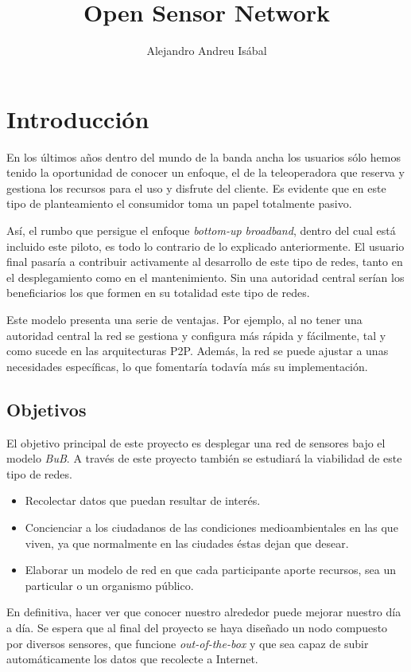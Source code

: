 \documentclass[a4paper]{article}
\title{Open Sensor Network}
\author{Alejandro Andreu Isábal}
\begin{document}
\maketitle

\section{Introducción}

En los últimos años dentro del mundo de la banda ancha los usuarios sólo hemos tenido la oportunidad de conocer un enfoque, el de la teleoperadora que reserva y gestiona los recursos para el uso y disfrute del cliente. Es evidente que en este tipo de planteamiento el consumidor toma un papel totalmente pasivo.

Así, el rumbo que persigue el enfoque \emph{bottom-up broadband}, dentro del cual está incluido este piloto, es todo lo contrario de lo explicado anteriormente. El usuario final pasaría a contribuir activamente al desarrollo de este tipo de redes, tanto en el desplegamiento como en el mantenimiento. Sin una autoridad central serían los beneficiarios los que formen en su totalidad este tipo de redes.

Este modelo presenta una serie de ventajas. Por ejemplo, al no tener una autoridad central la red se gestiona y configura más rápida y fácilmente, tal y como sucede en las arquitecturas P2P. Además, la red se puede ajustar a unas necesidades específicas, lo que fomentaría todavía más su implementación.


\subsection{Objetivos}
El objetivo principal de este proyecto es desplegar una red de sensores bajo el modelo \emph{BuB}. A través de este proyecto también se estudiará la viabilidad de este tipo de redes.

\begin{itemize}
    \item Recolectar datos que puedan resultar de interés.
    \item Concienciar a los ciudadanos de las condiciones medioambientales en las que viven, ya que normalmente en las ciudades éstas dejan que desear.
    \item Elaborar un modelo de red en que cada participante aporte recursos, sea un particular o un organismo público.
\end{itemize}

En definitiva, hacer ver que conocer nuestro alrededor puede mejorar nuestro día a día. Se espera que al final del proyecto se haya diseñado un nodo compuesto por diversos sensores, que funcione \emph{out-of-the-box} y que sea capaz de subir automáticamente los datos que recolecte a Internet.
\end{document}

